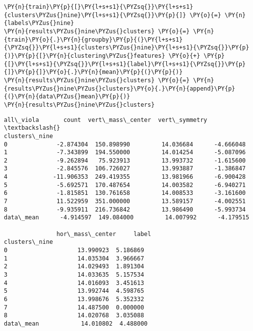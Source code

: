     \begin{tcolorbox}[breakable, size=fbox, boxrule=1pt, pad at break*=1mm,colback=cellbackground, colframe=cellborder]
\begin{Verbatim}[commandchars=\\\{\}]
\PY{n}{train}\PY{p}{[}\PY{l+s+s1}{\PYZsq{}}\PY{l+s+s1}{clusters\PYZus{}nine}\PY{l+s+s1}{\PYZsq{}}\PY{p}{]} \PY{o}{=} \PY{n}{labels\PYZus{}nine}
\PY{n}{results\PYZus{}nine\PYZus{}clusters} \PY{o}{=} \PY{n}{train}\PY{o}{.}\PY{n}{groupby}\PY{p}{(}\PY{l+s+s1}{\PYZsq{}}\PY{l+s+s1}{clusters\PYZus{}nine}\PY{l+s+s1}{\PYZsq{}}\PY{p}{)}\PY{p}{[}\PY{n}{clustering\PYZus{}features} \PY{o}{+} \PY{p}{[}\PY{l+s+s1}{\PYZsq{}}\PY{l+s+s1}{label}\PY{l+s+s1}{\PYZsq{}}\PY{p}{]}\PY{p}{]}\PY{o}{.}\PY{n}{mean}\PY{p}{(}\PY{p}{)}
\PY{n}{results\PYZus{}nine\PYZus{}clusters} \PY{o}{=} \PY{n}{results\PYZus{}nine\PYZus{}clusters}\PY{o}{.}\PY{n}{append}\PY{p}{(}\PY{n}{data\PYZus{}mean}\PY{p}{)}
\PY{n}{results\PYZus{}nine\PYZus{}clusters}
\end{Verbatim}
\end{tcolorbox}

            \begin{tcolorbox}[breakable, size=fbox, boxrule=.5pt, pad at break*=1mm, opacityfill=0]
\begin{Verbatim}[commandchars=\\\{\}]
               all\_viola       count  vert\_mass\_center  vert\_symmetry  \textbackslash{}
clusters\_nine
0              -2.874304  150.898990         14.036684      -4.666048
1              -7.343899  194.550000         14.014254      -5.087096
2              -9.262894   75.923913         13.993732      -1.615600
3              -2.845576  106.726027         13.993887      -1.386847
4             -11.906353  249.419355         13.981966      -6.900428
5              -5.692571  170.487654         14.003582      -6.940271
6              -1.815851  130.761658         14.008533      -3.161600
7              11.522959  351.000000         13.589157      -4.002551
8              -9.935911  216.736842         13.986490      -5.993734
data\_mean      -4.914597  149.084000         14.007992      -4.179515

               hor\_mass\_center     label
clusters\_nine
0                    13.990923  5.186869
1                    14.035304  3.966667
2                    14.029493  1.891304
3                    14.033635  5.157534
4                    14.016093  3.451613
5                    13.992744  4.598765
6                    13.998676  5.352332
7                    14.487500  0.000000
8                    14.020768  3.035088
data\_mean            14.010802  4.488000
\end{Verbatim}
\end{tcolorbox}
        
